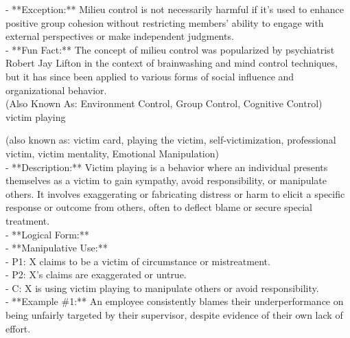 \documentclass[a4paper,12pt,single,pdftex]{scrbook}
\begin{document}
    
      - **Exception:** Milieu control is not necessarily harmful if it’s used to enhance positive group cohesion without restricting members' ability to engage with external perspectives or make independent judgments.
    \\

    
      - **Fun Fact:** The concept of milieu control was popularized by psychiatrist Robert Jay Lifton in the context of brainwashing and mind control techniques, but it has since been applied to various forms of social influence and organizational behavior.
    \\

  
    
      (Also Known As: Environment Control, Group Control, Cognitive Control)
    \\

  

 victim playing
    
      (also known as: victim card, playing the victim, self-victimization, professional victim, victim mentality, Emotional Manipulation)
    \\

  
    
      - **Description:** Victim playing is a behavior where an individual presents themselves as a victim to gain sympathy, avoid responsibility, or manipulate others. It involves exaggerating or fabricating distress or harm to elicit a specific response or outcome from others, often to deflect blame or secure special treatment.
    \\

    
      - **Logical Form:**
    \\

    
        - **Manipulative Use:**
    \\

    
          - P1: X claims to be a victim of circumstance or mistreatment.
    \\

    
          - P2: X's claims are exaggerated or untrue.
    \\

    
          - C: X is using victim playing to manipulate others or avoid responsibility.
    \\

    
      - **Example \#1:** An employee consistently blames their underperformance on being unfairly targeted by their supervisor, despite evidence of their own lack of effort.
    \\
\end{document}
